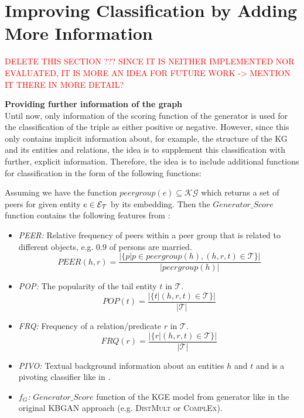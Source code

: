 \section{Improving Classification by Adding More Information} 
\label{sec:improving_classification}

\textcolor{red}{DELETE THIS SECTION ??? SINCE IT IS NEITHER IMPLEMENTED NOR EVALUATED, IT IS MORE AN IDEA FOR FUTURE WORK -> MENTION IT THERE IN MORE DETAIL?}


\textbf{Providing further information of the graph}\\
Until now, only information of the scoring function of the generator is used for the classification of the triple as either positive or negative.
However, since this only contains implicit information about, for example, the structure of the \ac{KG} and its entities and relations, the idea is to supplement this classification with further, explicit information.
Therefore, the idea is to include additional functions for classification in the form of the following functions: 

Assuming we have the function $peergroup(e) \subseteq \mathcal{KG}$ which returns a set of peers for given entity $e \in \mathcal{E}_{\mathcal{T}}$ by its embedding. 
Then the $Generator\_Score$ function contains the following features from \cite{arnaout2020enriching}:
\begin{itemize}
    \item 
    \emph{\ac{PEER}:} 
    Relative frequency of peers within a peer group that is related to different objects, e.g. 0.9 of persons are married. 
    \begin{equation}
        PEER(h,r) = \frac{|\{p | p \in peergroup(h), (h, r, t) \in \mathcal{T}\}|}{|peergroup(h)|}
    \end{equation}

    \item
    \emph{\ac{POP}:} 
    The popularity of the tail entity $t$ in $\mathcal{T}$. 
    \begin{equation}
        POP(t) = \frac{|\{t | (h, r , t) \in \mathcal{T}\}|}{|\mathcal{T}|}
    \end{equation}

    \item 
    \emph{\ac{FRQ}:} 
    Frequency of a relation/predicate $r$ in $\mathcal{T}$. 
    \begin{equation}
        FRQ(r) = \frac{|\{r | (h, r, t) \in \mathcal{T}\}|}{|\mathcal{T}|}
    \end{equation}
    
    \item 
    \emph{\ac{PIVO}:} 
    Textual background information about an entities $h$ and $t$ and is a pivoting classifier like in \cite{arnaout2020enriching}.
    
    \item 
    \emph{$f_G$:} 
    $Generator\_Score$ function of the \ac{KGE} model from generator like in the original \ac{KBGAN} approach (e.g. \textsc{DistMult}  or \textsc{ComplEx}).
\end{itemize}


